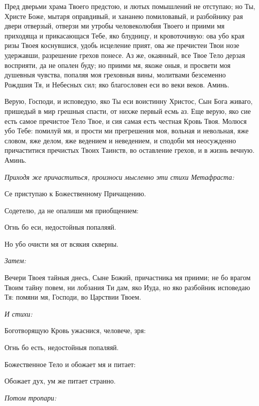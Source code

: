 Пред дверьми храма Твоего предстою, и лютых помышлений не отступаю; но Ты, Христе Боже, мытаря оправдивый, и хананею помиловавый, и разбойнику рая двери отверзый, отверзи ми утробы человеколюбия Твоего и приими мя приходяща и прикасающася Тебе, яко блудницу, и кровоточивую: ова убо края ризы Твоея коснувшися, удобь исцеление прият, ова же пречистеи Твои нозе удержавши, разрешение грехов понесе. Аз же, окаянный, все Твое Тело дерзая восприяти, да не опален буду; но приими мя, якоже оныя, и просвети моя душевныя чувства, попаляя моя греховныя вины, молитвами безсеменно Рождшия Тя, и Небесных сил; яко благословен еси во веки веков. Аминь.






Верую, Господи, и исповедую, яко Ты еси воистинну Христос, Сын Бога живаго, пришедый в мир грешныя спасти, от нихже первый есмь аз. Еще верую, яко сие есть самое пречистое Тело Твое, и сия самая есть честная Кровь Твоя. Молюся убо Тебе: помилуй мя, и прости ми прегрешения моя, вольная и невольная, яже словом, яже делом, яже ведением и неведением, и сподоби мя неосужденно причаститися пречистых Твоих Таинств, во оставление грехов, и в жизнь вечную. Аминь.


\medskip\itshape Приходя же причаститься, произноси мысленно эти стихи Метафраста:\normalfont{}


  Се приступаю к Божественному Причащению.


  Содетелю, да не опалиши мя приобщением:


  Огнь бо еси, недостойныя попаляяй.


  Но убо очисти мя от всякия скверны.





\itshape Затем:\normalfont{}


  Вечери Твоея тайныя днесь, Сыне Божий, причастника мя приими; не бо врагом Твоим тайну повем, ни лобзания Ти дам, яко Иуда, но яко разбойник исповедаю Тя: помяни мя, Господи, во Царствии Твоем.


\medskip\itshape И стихи:\normalfont{}


  Боготворящую Кровь ужаснися, человече, зря:


  Огнь бо есть, недостойныя попаляяй.


  Божественное Тело и обожает мя и питает:


  Обожает дух, ум же питает странно.


\medskip\itshape Потом тропари:\normalfont{}


